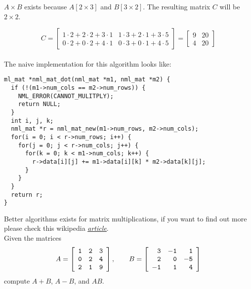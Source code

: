 $A\times B$ exists because $A[2\times 3]$ and $B[3\times 2]$. The resulting matrix $C$ will be $2\times 2$.

$$
C = \left[ \begin{array}{cc}
1\cdot 2 + 2\cdot 2 + 3\cdot 1 & 1\cdot 3 + 2\cdot 1 + 3\cdot 5 \\
0\cdot 2 + 0\cdot 2 + 4\cdot 1 & 0\cdot 3 + 0\cdot 1 + 4\cdot 5
\end{array} \right]
= 
\left[ \begin{array}{cc}
9 & 20 \\
4 & 20
\end{array} \right]
$$
\\
The naive implementation for this algorithm looks like:

\begin{verbatim}
ml_mat *nml_mat_dot(nml_mat *m1, nml_mat *m2) {
  if (!(m1->num_cols == m2->num_rows)) {
    NML_ERROR(CANNOT_MULITPLY);
    return NULL;
  }
  int i, j, k;
  nml_mat *r = nml_mat_new(m1->num_rows, m2->num_cols);
  for(i = 0; i < r->num_rows; i++) {
    for(j = 0; j < r->num_cols; j++) {
      for(k = 0; k < m1->num_cols; k++) {
        r->data[i][j] += m1->data[i][k] * m2->data[k][j];
      }
    }
  }
  return r;
}
\end{verbatim}

Better algorithms exists for matrix multiplications, if you want to find out more please check this wikipedia \href{https://en.wikipedia.org/wiki/Matrix_multiplication_algorithm}{\underline{\it article}}.
\\

\textsf{
\example Given the matrices
$$
A = \left[
\begin{array}{rrr}
\tt 1 & \tt 2 & \tt 3 \\
\tt 0 & \tt 2 & \tt 4 \\
\tt 2 & \tt 1 & \tt 9
\end{array}
\right]
,\qquad 
B = \left[
\begin{array}{rrr}
\tt 3 & \tt -1 & \tt 1 \\
\tt 2 & \tt 0 & \tt -5 \\
\tt -1 & \tt 1 & \tt 4
\end{array}
\right]
$$
compute $A+B$, $A-B$, and $AB$.
}

